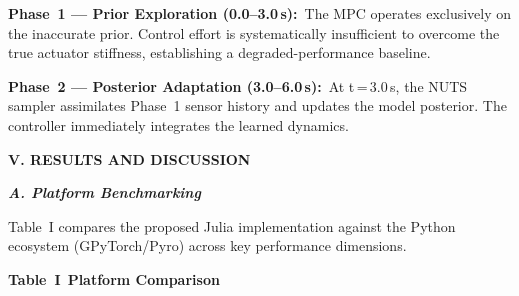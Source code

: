 \documentclass[letterpaper, 10pt, journal, twoside]{IEEEtran}
\begin{document}
\textbf{Phase~1 --- Prior Exploration (0.0--3.0\,s): }The MPC operates
exclusively on the inaccurate prior. Control effort is systematically
insufficient to overcome the true actuator stiffness, establishing a
degraded-performance baseline.

\textbf{Phase~2 --- Posterior Adaptation (3.0--6.0\,s): }At
t\,=\,3.0\,s, the NUTS sampler assimilates Phase~1 sensor history and
updates the model posterior. The controller immediately integrates the
learned dynamics.

\textbf{V. RESULTS AND DISCUSSION}

\emph{\textbf{A. Platform Benchmarking}}

Table~I compares the proposed Julia implementation against the Python
ecosystem (GPyTorch/Pyro) across key performance dimensions.

\textbf{Table~I Platform Comparison}
\end{document}
